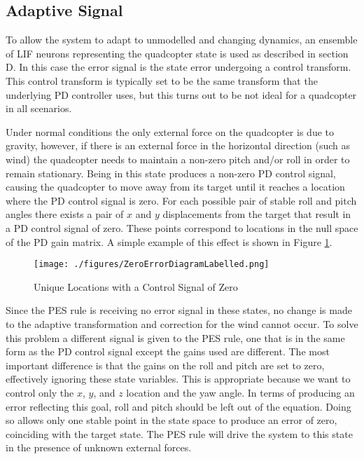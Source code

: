 \documentclass[letterpaper, 10 pt, conference]{ieeeconf}  %
\begin{document}
\subsection{Adaptive Signal}

To allow the system to adapt to unmodelled and changing dynamics, an ensemble of LIF neurons representing the quadcopter state is used as described in section D.
In this case the error signal is the state error undergoing a control transform.
This control transform is typically set to be the same transform that the underlying PD controller uses, but this turns out to be not ideal for a quadcopter in all scenarios.

Under normal conditions the only external force on the quadcopter is due to gravity, however, if there is an external force in the horizontal direction (such as wind) the quadcopter needs to maintain a non-zero pitch and/or roll in order to remain stationary.
Being in this state produces a non-zero PD control signal, causing the quadcopter to move away from its target until it reaches a location where the PD control signal is zero.
For each possible pair of stable roll and pitch angles there exists a pair of $x$ and $y$ displacements from the target that result in a PD control signal of zero.
These points correspond to locations in the null space of the PD gain matrix.
A simple example of this effect is shown in Figure \ref{fig:zeroError}.

\begin{figure}
\centering
\texttt{[image: ./figures/ZeroErrorDiagramLabelled.png]}
\caption{Unique Locations with a Control Signal of Zero}
\label{fig:zeroError}
\end{figure}

Since the PES rule is receiving no error signal in these states, no change is made to the adaptive transformation and correction for the wind cannot occur.
To solve this problem a different signal is given to the PES rule, one that is in the same form as the PD control signal except the gains used are different.
The most important difference is that the gains on the roll and pitch are set to zero, effectively ignoring these state variables.
This is appropriate because we want to control only the $x$, $y$, and $z$ location and the yaw angle.
In terms of producing an error reflecting this goal, roll and pitch should be left out of the equation.
Doing so allows only one stable point in the state space to produce an error of zero, coinciding with the target state.
The PES rule will drive the system to this state in the presence of unknown external forces.
\end{document}
